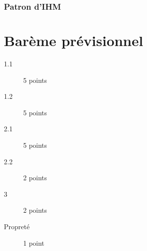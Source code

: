 \documentclass[12pt]{article}
\begin{document}
\fbox{ \begin{minipage}{6in} \hfill\vspace{1.5in} \end{minipage} }

\subsubsection*{Patron d'IHM}

\fbox{ \begin{minipage}{6in} \hfill\vspace{1.5in} \end{minipage} }

\section*{Bar\`eme prévisionnel}

\begin{description}
\item[1.1] 5 points
\item[1.2] 5 points
\item[2.1] 5 points
\item[2.2] 2 points
\item[3] 2 points
\item[Propret\'e]  1 point
\end{description}
\end{document}
